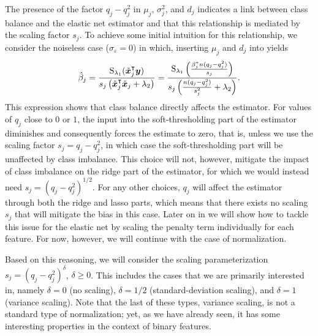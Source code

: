 The presence of the factor \(q_j - q_j^2\) in \(\mu_j\), \(\sigma_j^2\), and \(d_j\)
indicates a link between class balance and the elastic net estimator and that this
relationship is mediated by the scaling factor \(s_j\). To achieve some initial intuition
for this relationship, we consider the noiseless case (\(\sigma_\varepsilon = 0\)) in
which, inserting \(\mu_j\) and \(d_j\) into  yields
\begin{equation}
  \label{eq:noiseless-estimator}
  \hat{\beta}_j = \frac{\operatorname{S}_{\lambda_1}(\tilde{\boldsymbol{x}}_j^\intercal \boldsymbol{y})}{s_j\left(\tilde{\boldsymbol{x}}_j^\intercal \tilde{\boldsymbol{x}}_j + \lambda_2\right)}
  =
  \frac{\operatorname{S}_{\lambda_1}\left(\frac{\beta_j^* n (q_j - q_j^2)}{s_j}\right)}{s_j\left(\frac{n(q_j - q_j^2)}{s_j^2} + \lambda_2\right)}.
\end{equation}
%
This expression shows that class balance directly affects the estimator. For values of
\(q_j\) close to \(0\) or \(1\), the input into the soft-thresholding part of the estimator
diminishes and consequently forces the estimate to zero, that is, unless we use the scaling
factor \(s_j = q_j - q_j^2\), in which case the soft-thresholding part will be unaffected
by class imbalance. This choice will not, however, mitigate the impact of class imbalance
on the ridge part of the estimator, for which we would instead need \(s_j = (q_j -
q_j^2)^{1/2}\). For any other choices, \(q_j\) will affect the estimator through both the
ridge and lasso parts, which means that there exists no scaling \(s_j\) that will mitigate
the bias in this case. Later on in  we will show how to tackle
this issue for the elastic net by scaling the penalty term individually for each feature.
For now, however, we will continue with the case of normalization.

Based on this reasoning, we will consider the scaling parameterization \(s_j =
(q_j-q_j^2)^\delta\), \(\delta \geq 0\). This includes the cases that we are primarily
interested in, namely \(\delta = 0\) (no scaling), \(\delta = 1/2\) (standard-deviation
scaling), and \(\delta = 1\) (variance scaling). Note that the last of these types,
variance scaling, is not a standard type of normalization; yet, as we have already seen, it
has some interesting properties in the context of binary features.

